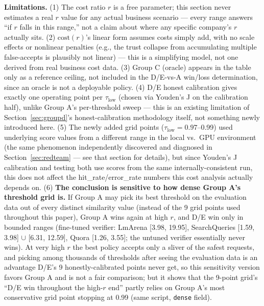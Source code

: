\documentclass[11pt]{article}
\newcommand{\taulow}{\ensuremath{\tau_{\text{low}}}}
\begin{document}
\textbf{Limitations.} (1) The cost ratio $r$ is a free parameter; this section never estimates a real $r$ value for any actual business scenario --- every range answers ``if $r$ falls in this range,'' not a claim about where any specific company's $r$ actually sits. (2) $\mathrm{cost}(r)$'s linear form assumes costs simply add, with no scale effects or nonlinear penalties (e.g., the trust collapse from accumulating multiple false-accepts is plausibly not linear) --- this is a simplifying model, not one derived from real business cost data. (3) Group C (oracle) appears in the table only as a reference ceiling, not included in the D/E-vs-A win/loss determination, since an oracle is not a deployable policy. (4) D/E honest calibration gives exactly one operating point per $\taulow$ (chosen via Youden's J on the calibration half), unlike Group A's per-threshold sweep --- this is an existing limitation of Section~\ref{sec:groupd}'s honest-calibration methodology itself, not something newly introduced here. (5) The newly added grid points ($\taulow=0.97$--0.99) used underlying score values from a different range in the local vs.\ GPU environment (the same phenomenon independently discovered and diagnosed in Section~\ref{sec:redteam} --- see that section for details), but since Youden's J calibration and testing both use scores from the same internally-consistent run, this does not affect the hit\_rate/error\_rate numbers this cost analysis actually depends on. (6) \textbf{The conclusion is sensitive to how dense Group A's threshold grid is.} If Group A may pick its best threshold on the evaluation data out of every distinct similarity value (instead of the 9 grid points used throughout this paper), Group A wins again at high $r$, and D/E win only in bounded ranges (fine-tuned verifier: LmArena [3.98, 19.95], SearchQueries [1.59, 3.98] $\cup$ [6.31, 12.59], Quora [1.26, 3.55]; the untuned verifier essentially never wins). At very high $r$ the best policy accepts only a sliver of the safest requests, and picking among thousands of thresholds after seeing the evaluation data is an advantage D/E's 9 honestly-calibrated points never get, so this sensitivity version favors Group A and is not a fair comparison; but it shows that the 9-point grid's ``D/E win throughout the high-$r$ end'' partly relies on Group A's most conservative grid point stopping at 0.99 (same script, \texttt{dense} field).
\end{document}
